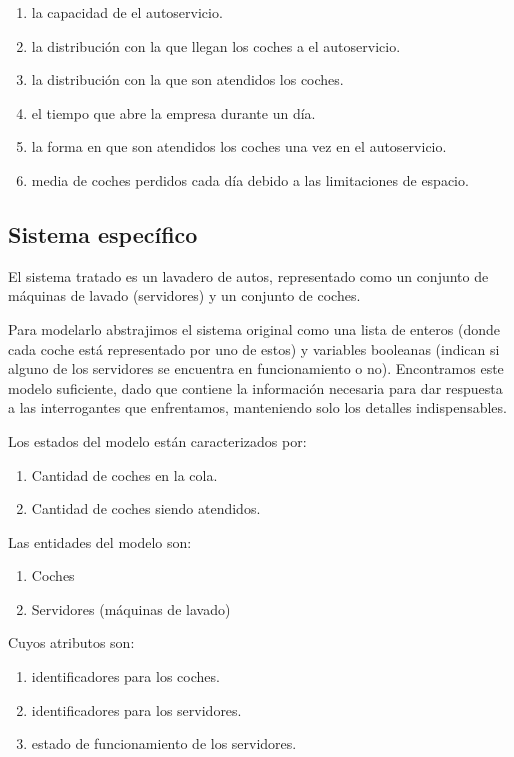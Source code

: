 \documentclass[14pt]{extarticle}
\begin{document}
\begin{enumerate}
    \item la capacidad de el autoservicio.
    \item la distribución con la que llegan los coches a el autoservicio.
    \item la distribución con la que son atendidos los coches.
    \item el tiempo que abre la empresa durante un día.
    \item la forma en que son atendidos los coches una vez en el autoservicio.
    \item media de coches perdidos cada día debido a las limitaciones de espacio.
\end{enumerate}

\subsection{Sistema específico}

El sistema tratado es un lavadero de autos, representado como un conjunto de máquinas de lavado (servidores) y un conjunto de coches.

Para modelarlo abstrajimos el sistema original como una lista de enteros (donde cada coche está representado por uno de estos) y variables booleanas (indican si alguno de los servidores se encuentra en funcionamiento o no). Encontramos este modelo suficiente, dado que contiene la información necesaria para dar respuesta a las interrogantes que enfrentamos, manteniendo solo los detalles indispensables.

Los estados del modelo están caracterizados por:

\begin{enumerate}
    \item Cantidad de coches en la cola.
    \item Cantidad de coches siendo atendidos.
\end{enumerate}

Las entidades del modelo son:

\begin{enumerate}
    \item Coches
    \item Servidores (máquinas de lavado)
\end{enumerate}

Cuyos atributos son:

\begin{enumerate}
    \item identificadores para los coches.
    \item identificadores para los servidores.
    \item estado de funcionamiento de los servidores.
\end{enumerate}
\end{document}
